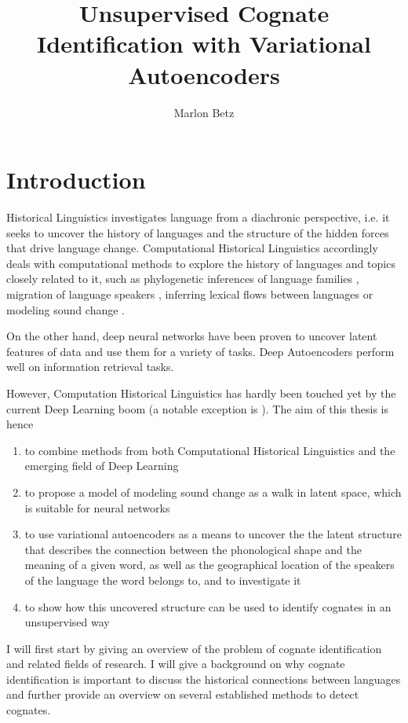 \documentclass[8pt]{article}
\title{Unsupervised Cognate Identification with Variational Autoencoders}
\author{Marlon Betz}
\begin{document}
\maketitle
\newpage
\tableofcontents
\section{Introduction}

Historical Linguistics investigates language from a diachronic perspective, i.e. it seeks to uncover the history of languages and the structure of the hidden forces that drive language change.  Computational Historical Linguistics accordingly deals with computational methods to explore the history of languages and topics closely related to it, such as phylogenetic inferences of language families \cite{bouckaert2012mapping}, migration of language speakers \cite{gray2009language}, inferring lexical flows between languages \cite{dellert2015uralic} or modeling sound change \cite{bouchard2013automated}.  

On the other hand, deep neural networks have been proven to uncover latent features of data and use them for a variety of tasks. Deep Autoencoders perform well on information retrieval tasks.


 However, Computation Historical Linguistics has hardly been touched yet by the current Deep Learning boom (a notable exception is \cite{rama2016siamese}). 
The aim of this thesis is hence 
\begin{enumerate}
\item to combine methods from both Computational Historical Linguistics and the emerging field of Deep Learning
\item to propose a model of modeling sound change as a walk in latent space, which is suitable for neural networks
\item to use variational autoencoders as a means to uncover the the latent structure that describes the connection between the phonological shape and the meaning of a given word, as well as the geographical location of the speakers of the language the word belongs to, and to investigate it
\item to show how this uncovered structure can be used to identify cognates in an unsupervised way
\end{enumerate}

I will first start by giving an overview of the problem of cognate identification and related fields of research. I will give a background on why cognate identification is important to discuss the historical connections between languages and further provide an overview on several established methods to detect cognates.  
\end{document}
